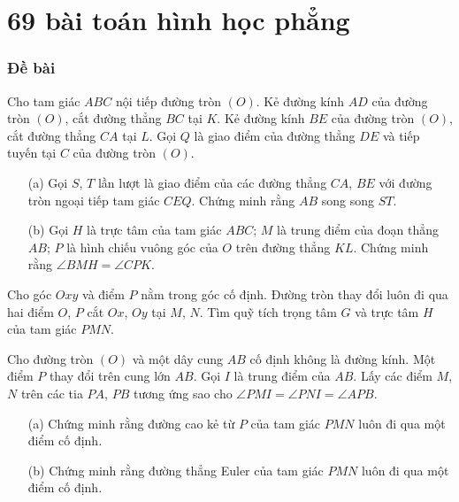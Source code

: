 \part{69 bài toán hình học phẳng}

\setcounter{section}{0}

    \section{Đề bài}

        \begin{exercise}
            Cho tam giác \(ABC\) nội tiếp đường tròn \((O)\). Kẻ đường kính \(AD\) của đường tròn \((O)\), cắt đường thẳng \(BC\) tại \(K\). Kẻ đường kính \(BE\) của đường tròn \((O)\), cắt đường thẳng \(CA\) tại \(L\). Gọi \(Q\) là giao điểm của đường thẳng \(DE\) và tiếp tuyến tại \(C\) của đường tròn \((O)\).
            \begin{enumerate}
                \item[(a)] Gọi \(S\), \(T\) lần lượt là giao điểm của các đường thẳng \(CA\), \(BE\) với đường tròn ngoại tiếp tam giác \(CEQ\). Chứng minh rằng \(AB\) song song \(ST\).
                \item[(b)] Gọi \(H\) là trực tâm của tam giác \(ABC\); \(M\) là trung điểm của đoạn thẳng \(AB\); \(P\) là hình chiếu vuông góc của \(O\) trên đường thẳng \(KL\). Chứng minh rằng \(\angle BMH = \angle CPK\).
            \end{enumerate}
        \end{exercise}

        \boom

        \begin{exercise}
            Cho góc \(Oxy\) và điểm \(P\) nằm trong góc cố định. Đường tròn thay đổi luôn đi qua hai điểm \(O\), \(P\) cắt \(Ox\), \(Oy\) tại \(M\), \(N\). Tìm quỹ tích trọng tâm \(G\) và trực tâm \(H\) của tam giác \(PMN\).
        \end{exercise}

        \boom

        \begin{exercise}
            Cho đường tròn \((O)\) và một dây cung \(AB\) cố định không là đường kính. Một điểm \(P\) thay đổi trên cung lớn \(AB\). Gọi \(I\) là trung điểm của \(AB\). Lấy các điểm \(M\), \(N\) trên các tia \(PA\), \(PB\) tương ứng sao cho \(\angle PMI = \angle PNI = \angle APB\).
            \begin{enumerate}
                \item[(a)] Chứng minh rằng đường cao kẻ từ \(P\) của tam giác \(PMN\) luôn đi qua một điểm cố định.
                \item[(b)] Chứng minh rằng đường thẳng Euler của tam giác \(PMN\) luôn đi qua một điểm cố định.
            \end{enumerate}
        \end{exercise}

